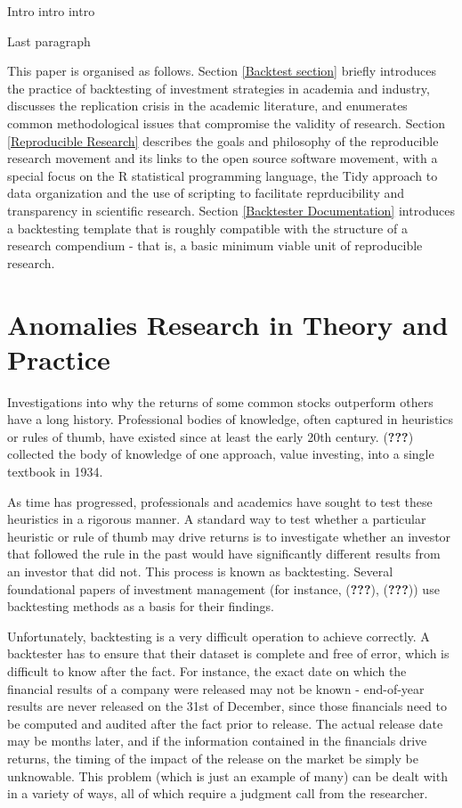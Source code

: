 \documentclass[11pt,preprint, authoryear]{elsarticle}
\numberwithin{equation}{section}
\numberwithin{figure}{section}
\numberwithin{table}{section}
\begin{document}
Intro intro intro

Last paragraph

This paper is organised as follows. Section \ref{Backtest section}
briefly introduces the practice of backtesting of investment strategies
in academia and industry, discusses the replication crisis in the
academic literature, and enumerates common methodological issues that
compromise the validity of research. Section \ref{Reproducible Research}
describes the goals and philosophy of the reproducible research movement
and its links to the open source software movement, with a special focus
on the R statistical programming language, the Tidy approach to data
organization and the use of scripting to facilitate reprducibility and
transparency in scientific research. Section
\ref{Backtester Documentation} introduces a backtesting template that is
roughly compatible with the structure of a research compendium - that
is, a basic minimum viable unit of reproducible research.

\section{\texorpdfstring{Anomalies Research in Theory and
Practice\label{Backtest section}}{Anomalies Research in Theory and Practice}}\label{anomalies-research-in-theory-and-practice}

Investigations into why the returns of some common stocks outperform
others have a long history. Professional bodies of knowledge, often
captured in heuristics or rules of thumb, have existed since at least
the early 20th century. ({\textbf{???}}) collected the body of knowledge
of one approach, value investing, into a single textbook in 1934.

As time has progressed, professionals and academics have sought to test
these heuristics in a rigorous manner. A standard way to test whether a
particular heuristic or rule of thumb may drive returns is to
investigate whether an investor that followed the rule in the past would
have significantly different results from an investor that did not. This
process is known as backtesting. Several foundational papers of
investment management (for instance, ({\textbf{???}}), ({\textbf{???}}))
use backtesting methods as a basis for their findings.

Unfortunately, backtesting is a very difficult operation to achieve
correctly. A backtester has to ensure that their dataset is complete and
free of error, which is difficult to know after the fact. For instance,
the exact date on which the financial results of a company were released
may not be known - end-of-year results are never released on the 31st of
December, since those financials need to be computed and audited after
the fact prior to release. The actual release date may be months later,
and if the information contained in the financials drive returns, the
timing of the impact of the release on the market be simply be
unknowable. This problem (which is just an example of many) can be dealt
with in a variety of ways, all of which require a judgment call from the
researcher.
\end{document}
